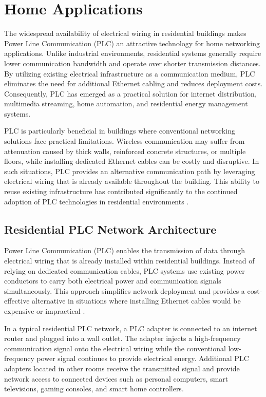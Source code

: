 \section{Home Applications}
\label{sec:home}

The widespread availability of electrical wiring in residential buildings makes Power Line Communication (PLC) an attractive technology for home networking applications. Unlike industrial environments, residential systems generally require lower communication bandwidth and operate over shorter transmission distances. By utilizing existing electrical infrastructure as a communication medium, PLC eliminates the need for additional Ethernet cabling and reduces deployment costs. Consequently, PLC has emerged as a practical solution for internet distribution, multimedia streaming, home automation, and residential energy management systems.

PLC is particularly beneficial in buildings where conventional networking solutions face practical limitations. Wireless communication may suffer from attenuation caused by thick walls, reinforced concrete structures, or multiple floors, while installing dedicated Ethernet cables can be costly and disruptive. In such situations, PLC provides an alternative communication path by leveraging electrical wiring that is already available throughout the building. This ability to reuse existing infrastructure has contributed significantly to the continued adoption of PLC technologies in residential environments \cite{Ferreira1996PowerLineCommunicationsOverview}.

\subsection{Residential PLC Network Architecture}

Power Line Communication (PLC) enables the transmission of data through electrical wiring that is already installed within residential buildings. Instead of relying on dedicated communication cables, PLC systems use existing power conductors to carry both electrical power and communication signals simultaneously. This approach simplifies network deployment and provides a cost-effective alternative in situations where installing Ethernet cables would be expensive or impractical \cite{Ferreira1996PowerLineCommunicationsOverview}.

In a typical residential PLC network, a PLC adapter is connected to an internet router and plugged into a wall outlet. The adapter injects a high-frequency communication signal onto the electrical wiring while the conventional low-frequency power signal continues to provide electrical energy. Additional PLC adapters located in other rooms receive the transmitted signal and provide network access to connected devices such as personal computers, smart televisions, gaming consoles, and smart home controllers.


